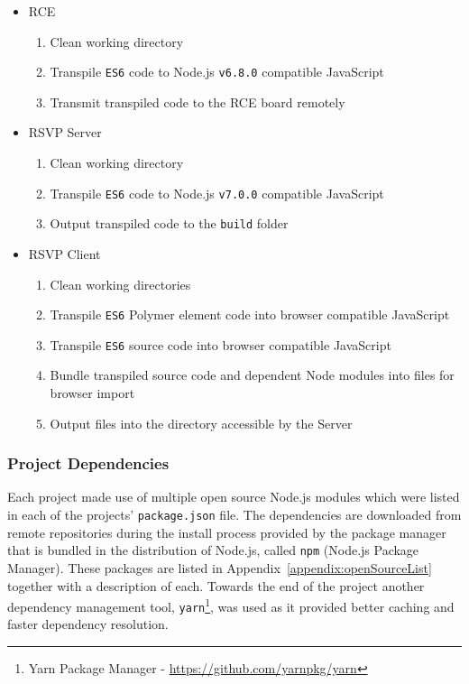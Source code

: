       \begin{itemize}
        \item RCE
        \begin{enumerate}
          \item Clean working directory
          \item Transpile \texttt{ES6} code to Node.js \texttt{v6.8.0} compatible JavaScript
          \item Transmit transpiled code to the RCE board remotely
        \end{enumerate}
        \item RSVP Server
        \begin{enumerate}
          \item Clean working directory
          \item Transpile \texttt{ES6} code to Node.js \texttt{v7.0.0} compatible JavaScript
          \item Output transpiled code to the \texttt{build} folder
        \end{enumerate}
        \item RSVP Client
        \begin{enumerate}
          \item Clean working directories
          \item Transpile \texttt{ES6} Polymer element code into browser compatible JavaScript
          \item Transpile \texttt{ES6} source code into browser compatible JavaScript
          \item Bundle transpiled source code and dependent Node modules into files for browser import
          \item Output files into the directory accessible by the Server
        \end{enumerate}
      \end{itemize}
      
    \subsubsection{Project Dependencies}
      Each project made use of multiple open source Node.js modules which were listed in each of the projects' \texttt{package.json} file. The dependencies are downloaded from remote repositories during the install process provided by the package manager that is bundled in the distribution of Node.js, called \texttt{npm} (Node.js Package Manager). These packages are listed in Appendix~\ref{appendix:openSourceList} together with a description of each. Towards the end of the project another dependency management tool, \texttt{yarn}\footnote{Yarn Package Manager - \url{https://github.com/yarnpkg/yarn}}, was used as it provided better caching and faster dependency resolution.
      
